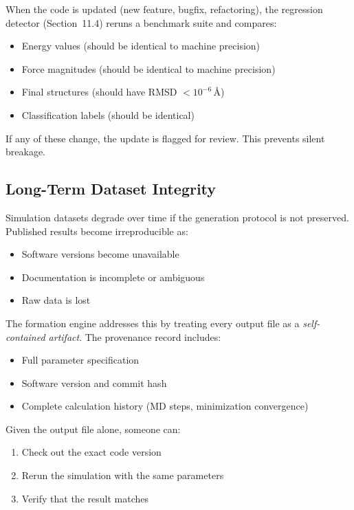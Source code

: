 \documentclass[11pt]{article}
\begin{document}
When the code is updated (new feature, bugfix, refactoring), the regression detector (Section~11.4) reruns a benchmark suite and compares:

\begin{itemize}
\item Energy values (should be identical to machine precision)
\item Force magnitudes (should be identical to machine precision)
\item Final structures (should have RMSD $< 10^{-6}$\,Å)
\item Classification labels (should be identical)
\end{itemize}

If any of these change, the update is flagged for review. This prevents silent breakage.

\subsection{Long-Term Dataset Integrity}

Simulation datasets degrade over time if the generation protocol is not preserved. Published results become irreproducible as:

\begin{itemize}
\item Software versions become unavailable
\item Documentation is incomplete or ambiguous
\item Raw data is lost
\end{itemize}

The formation engine addresses this by treating every output file as a \textit{self-contained artifact}. The provenance record includes:

\begin{itemize}
\item Full parameter specification
\item Software version and commit hash
\item Complete calculation history (MD steps, minimization convergence)
\end{itemize}

Given the output file alone, someone can:

\begin{enumerate}
\item Check out the exact code version
\item Rerun the simulation with the same parameters
\item Verify that the result matches
\end{enumerate}
\end{document}
